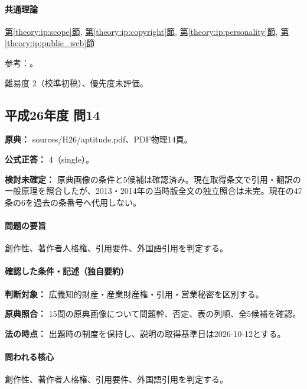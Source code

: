 \paragraph{共通理論} \hyperref[theory:ip:scope]{第\ref*{theory:ip:scope}節}, \hyperref[theory:ip:copyright]{第\ref*{theory:ip:copyright}節}, \hyperref[theory:ip:personality]{第\ref*{theory:ip:personality}節}, \hyperref[theory:ip:public_web]{第\ref*{theory:ip:public_web}節}

\par 参考：\cite{ip_industrial_four,ip_copyright_statute}。

\par 難易度 2（校準初稿）、優先度未評価。

\subsection{平成26年度 問14}
\label{q:h26-reg-apt-14}

\noindent\textbf{原典：} sources/H26/aptitude.pdf、PDF物理14頁。

\textbf{公式正答：} 4（single）。

\par\textbf{検討未確定：} 原典画像の条件と5候補は確認済み。現在取得条文で引用・翻訳の一般原理を照合したが、2013・2014年の当時版全文の独立照合は未完。現在の47条の6を過去の条番号へ代用しない。

\paragraph{問題の要旨} 創作性、著作者人格権、引用要件、外国語引用を判定する。

\paragraph{確認した条件・記述（独自要約）}\mbox{}\par

\noindent\textbf{判断対象：} 広義知的財産・産業財産権・引用・営業秘密を区別する。\par

\noindent\textbf{原典照合：} 15問の原典画像について問題幹、否定、表の列順、全5候補を確認。\par

\noindent\textbf{法の時点：} 出題時の制度を保持し、説明の取得基準日は2026-10-12とする。\par

\paragraph{問われる核心} 創作性、著作者人格権、引用要件、外国語引用を判定する。


